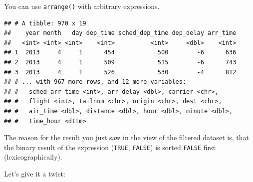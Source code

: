 \documentclass[]{book}
\newenvironment{Shaded}{}{}
\newcommand{\DecValTok}[1]{#1}
\newcommand{\KeywordTok}[1]{\textcolor[rgb]{0.00,0.00,1.00}{#1}}
\newcommand{\NormalTok}[1]{#1}
\newcommand{\OperatorTok}[1]{#1}
\newcommand{\StringTok}[1]{\textcolor[rgb]{0.00,0.50,0.50}{#1}}
\begin{document}
You can use \texttt{arrange()} with arbitrary expressions.

\begin{Shaded}
\end{Shaded}

\begin{verbatim}
## # A tibble: 970 x 19
##    year month   day dep_time sched_dep_time dep_delay arr_time
##   <int> <int> <int>    <int>          <int>     <dbl>    <int>
## 1  2013     4     1      454            500        -6      636
## 2  2013     4     1      509            515        -6      743
## 3  2013     4     1      526            530        -4      812
## # ... with 967 more rows, and 12 more variables:
## #   sched_arr_time <int>, arr_delay <dbl>, carrier <chr>,
## #   flight <int>, tailnum <chr>, origin <chr>, dest <chr>,
## #   air_time <dbl>, distance <dbl>, hour <dbl>, minute <dbl>,
## #   time_hour <dttm>
\end{verbatim}

The reason for the result you just saw in the view of the filtered dataset is, that the binary result of the expression (\texttt{TRUE}, \texttt{FALSE}) is sorted \texttt{FALSE} first (lexicographically).

Let's give it a twist:

\begin{Shaded}
\end{Shaded}
\end{document}
